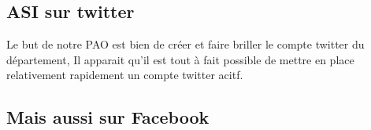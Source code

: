 \subsection{ASI sur twitter}
Le but de notre PAO est bien de créer et faire briller le compte twitter du département, Il apparait qu'il est tout à fait possible de mettre en place relativement rapidement un compte twitter acitf.
\subsection{Mais aussi sur Facebook}